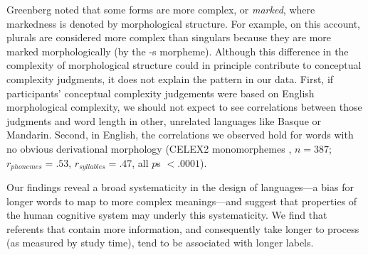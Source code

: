 \documentclass[12pt]{article}
\begin{document}


Greenberg\cite{greenberg1966} noted that some forms are more complex, or \emph{marked}, where markedness is denoted by morphological structure. For example, on this account, plurals are considered more complex than singulars because they are more marked morphologically (by the -s morpheme). Although this difference in the complexity of morphological structure could in principle contribute to conceptual complexity judgments, it does not explain the pattern in our data. First, if participants' conceptual complexity judgements were based on English morphological complexity, we should not expect to see correlations between those judgments and word length in other, unrelated languages like Basque or Mandarin. Second, in English, the correlations we observed hold for words with no obvious derivational morphology (CELEX2 monomorphemes \cite{baayen1995celex2}, $n = 387$; $r_{phonemes} = .53$, $r_{syllables} = .47$, all $p$s $< .0001$). 

Our findings reveal a broad systematicity in the design of languages---a bias for longer words to map to more complex meanings---and suggest that properties of the human cognitive system may underly this systematicity. We find that referents that contain more information, and consequently take longer to process (as measured by study time), tend to be associated with longer labels. 
\end{document}
